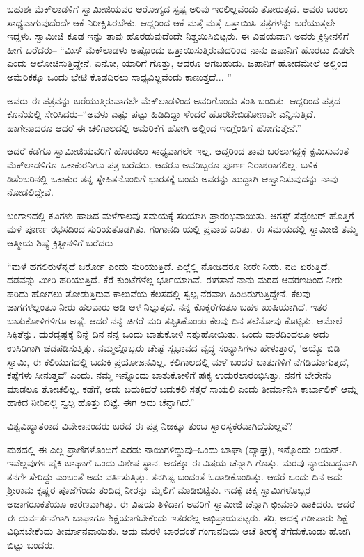 ಬಹುಶಃ ಮೆಕ್​ಲಾಡಳಿಗೆ ಸ್ವಾಮೀಜಿಯವರ ಆರೋಗ್ಯದ ಸ್ಪಷ್ಟ ಅರಿವು ಇರಲಿಲ್ಲವೆಂದು ತೋರುತ್ತದೆ. ಅವರು ಬರಲು ಸಾಧ್ಯವಾಗುವುದೆಂದೇ ಆಕೆ ನಿರೀಕ್ಷಿಸಿರಬೇಕು. ಆದ್ದರಿಂದ ಆಕೆ ಮತ್ತೆ ಮತ್ತೆ ಒತ್ತಾಯಿಸಿ ಪತ್ರಗಳನ್ನು ಬರೆಯುತ್ತಲೇ ಇದ್ದಳು. ಸ್ವಾಮೀಜಿ ಕೂಡ ಇನ್ನು ತಾವು ಹೊರಡುವುದೆಂದೇ ನಿಶ್ಚಯಿಸಿಬಿಟ್ಟರು. ಈ ವಿಷಯವಾಗಿ ಅವರು ಕ್ರಿಸ್ಟೀನಳಿಗೆ ಹೀಗೆ ಬರೆದರು– “ಮಿಸ್ ಮೆಕ್​ಲಾಡಳು ಅಷ್ಟೊಂದು ಒತ್ತಾಯಿಸುತ್ತಿರುವುದರಿಂದ ನಾನು ಜಪಾನಿಗೆ ಹೊರಟು ಬಿಡಲೇ ಎಂದು ಆಲೋಚಿಸುತ್ತಿದ್ದೇನೆ. ಏನೋ, ಯಾರಿಗೆ ಗೊತ್ತು, ಆದರೂ ಆಗಬಹುದು. ಜಪಾನಿಗೆ ಹೋದಮೇಲೆ ಅಲ್ಲಿಂದ ಅಮೆರಿಕಕ್ಕೂ ಒಂದು ಭೇಟಿ ಕೊಡದಿರಲು ಸಾಧ್ಯವಿಲ್ಲವೆಂದು ಕಾಣುತ್ತದೆ... ”

ಅವರು ಈ ಪತ್ರವನ್ನು ಬರೆಯುತ್ತಿರುವಾಗಲೇ ಮೆಕ್​ಲಾಡಳಿಂದ ಅವರಿಗೊಂದು ತಂತಿ ಬಂದಿತು. ಆದ್ದರಿಂದ ಪತ್ರದ ಕೊನೆಯಲ್ಲಿ ಸೇರಿಸಿದರು–“ಅವಳು ಎಷ್ಟು ಪಟ್ಟು ಹಿಡಿದಿದ್ದಾ ಳೆಂದರೆ ಹೊರಟೇಬಿಡೋಣವೇ ಎನ್ನಿಸುತ್ತಿದೆ. ಹಾಗೇನಾದರೂ ಆದರೆ ಈ ಚಳಿಗಾಲದಲ್ಲಿ ಅಮೆರಿಕೆಗೆ ಹೋಗಿ ಅಲ್ಲಿಂದ ಇಂಗ್ಲೆಂಡಿಗೆ ಹೋಗುತ್ತೇನೆ.”

ಆದರೆ ಕಡೆಗೂ ಸ್ವಾಮೀಜಿಯವರಿಗೆ ಹೊರಡಲು ಸಾಧ್ಯವಾಗಲೇ ಇಲ್ಲ. ಆದ್ದರಿಂದ ತಾವು ಬರಲಾಗದ್ದಕ್ಕೆ ಕ್ಷಮಿಸುವಂತೆ ಮೆಕ್​ಲಾಡಳಿಗೂ ಒಕಾಕುರನಿಗೂ ಪತ್ರ ಬರೆದರು. ಆದರೂ ಅವರಿಬ್ಬರೂ ಪೂರ್ಣ ನಿರಾಶರಾಗಲಿಲ್ಲ. ಬಳಿಕ ಡಿಸೆಂಬರಿನಲ್ಲಿ ಒಕಾಕುರ ತನ್ನ ಸ್ನೇಹಿತನೊಂದಿಗೆ ಭಾರತಕ್ಕೆ ಬಂದು ಅವರನ್ನು ಖುದ್ದಾಗಿ ಆಹ್ವಾನಿಸುವುದನ್ನು ನಾವು ನೋಡಲಿದ್ದೇವೆ.

ಬಂಗಾಳದಲ್ಲಿ ಕವಿಗಳು ಹಾಡಿದ ಮಳೆಗಾಲವು ಸಮಯಕ್ಕೆ ಸರಿಯಾಗಿ ಪ್ರಾರಂಭವಾಯಿತು. ಆಗಸ್ಟ್​-ಸೆಪ್ಟೆಂಬರ್ ಹೊತ್ತಿಗೆ ಮಳೆ ಪೂರ್ಣ ರಭಸದಿಂದ ಸುರಿಯತೊಡಗಿತು. ಗಂಗಾನದಿ ಯಲ್ಲಿ ಪ್ರವಾಹ ಏರಿತು. ಈ ಸಮಯದಲ್ಲಿ ಸ್ವಾಮೀಜಿ ತಮ್ಮ ಆತ್ಮೀಯ ಶಿಷ್ಯೆ ಕ್ರಿಸ್ಟೀನಳಿಗೆ ಬರೆದರು–

“ಮಳೆ ಹಗಲಿರುಳೆನ್ನದೆ ಜರ್ರೋ ಎಂದು ಸುರಿಯುತ್ತಿದೆ. ಎಲ್ಲೆಲ್ಲಿ ನೋಡಿದರೂ ನೀರೇ ನೀರು. ನದಿ ಏರುತ್ತಿದೆ. ದಡವನ್ನು ಮೀರಿ ಹರಿಯುತ್ತಿದೆ. ಕೆರೆ ಕುಂಟೆಗಳೆಲ್ಲ ಭರ್ತಿಯಾಗಿವೆ. ಈಗತಾನೆ ನಾನು ಮಠದ ಆವರಣದಿಂದ ನೀರು ಹರಿದು ಹೋಗಲು ತೋಡುತ್ತಿರುವ ಕಾಲುವೆಯ ಕೆಲಸದಲ್ಲಿ ಸ್ವಲ್ಪ ನೆರವಾಗಿ ಹಿಂದಿರುಗುತ್ತಿದ್ದೇನೆ. ಕೆಲವು ಜಾಗಗಳಲ್ಲಂತೂ ನೀರು ಹಲವಾರು ಅಡಿ ಆಳ ನಿಲ್ಲುತ್ತದೆ. ನನ್ನ ಕೊಕ್ಕರೆಗಂತೂ ಬಹಳ ಖುಷಿಯಾಗಿದೆ. ಇತರ ಬಾತುಕೋಳಿಗಳಿಗೂ ಅಷ್ಟೆ. ಆದರೆ ನನ್ನ ಚಿಗರೆ ಮರಿ ತಪ್ಪಿಸಿಕೊಂಡು ಕೆಲವು ದಿನ ತಲೆನೋವು ಕೊಟ್ಟಿತು. ಆಮೇಲೆ ಸಿಕ್ಕಿತೆನ್ನು. ದುರದೃಷ್ಟಕ್ಕೆ ನಿನ್ನೆ ದಿನ ನನ್ನ ಒಂದು ಬಾತುಕೋಳಿ ಸತ್ತುಹೋಯಿತು. ಒಂದು ವಾರದಿಂದಲೂ ಅದು ಉಸಿರಿಗಾಗಿ ಚಡಪಡಿಸುತ್ತಿತ್ತು. ನಮ್ಮಲ್ಲೊಬ್ಬರು ಚೇಷ್ಟೆ ಸ್ವಭಾವದ ವೃದ್ಧ ಸಂನ್ಯಾಸಿಗಳು ಹೇಳುತ್ತಾರೆ, ‘ಅಯ್ಯೊ ಬಿಡಿ ಸ್ವಾಮಿ, ಈ ಕಲಿಯುಗದಲ್ಲಿ ಬದುಕಿ ಪ್ರಯೋಜನವಿಲ್ಲ. ಕಲಿಗಾಲದಲ್ಲಿ ಮಳೆ ಬಂದರೆ ಬಾತುಗಳಿಗೆ ನೆಗಡಿಯಾಗುತ್ತದೆ, ಕಪ್ಪೆಗಳು ಸೀನುತ್ತವೆ’ ಎಂದು. ನಮ್ಮ ಇನ್ನೊಂದು ಬಾತುಕೋಳಿಗೆ ಪುಕ್ಕ ಉದುರಲಾರಂಭಿಸಿತ್ತು. ನನಗೆ ಬೇರೇನು ಮಾಡಲೂ ತೋಚಲಿಲ್ಲ. ಕಡೆಗೆ, ಅದು ಬದುಕಿದರೆ ಬದುಕಲಿ ಸತ್ತರೆ ಸಾಯಲಿ ಎಂದು ತೀರ್ಮಾನಿಸಿ ಕಾರ್ಬಾಲಿಕ್ ಆಮ್ಲ ಹಾಕಿದ ನೀರಿನಲ್ಲಿ ಸ್ವಲ್ಪ ಹೊತ್ತು ಬಿಟ್ಟೆ. ಈಗ ಅದು ಚೆನ್ನಾಗಿದೆ.”

ವಿಶ್ವವಿಖ್ಯಾತರಾದ ವಿವೇಕಾನಂದರು ಬರೆದ ಈ ಪತ್ರ ನಿಜಕ್ಕೂ ತುಂಬ ಸ್ವಾರಸ್ಯಕರವಾಗಿದೆಯಲ್ಲವೆ?

ಮಠದಲ್ಲಿ ಈ ಎಲ್ಲ ಪ್ರಾಣಿಗಳೊಂದಿಗೆ ಎರಡು ನಾಯಿಗಳಿದ್ದುವು–ಒಂದು ಬಾಘಾ (ವ್ಯಾಘ್ರ), ಇನ್ನೊಂದು ಲಯನ್. ಇವೆಲ್ಲವುಗಳ ಪೈಕಿ ಬಾಘಾಗೆ ಒಂದು ವಿಶೇಷ ಸ್ಥಾನ. ಅದಕ್ಕೂ ಈ ವಿಷಯ ಚೆನ್ನಾಗಿ ಗೊತ್ತು. ಮಠವು ನ್ಯಾಯಬದ್ಧವಾಗಿ ತನಗೇ ಸೇರಿದ್ದು ಎಂಬಂತೆ ಅದು ವರ್ತಿಸುತ್ತಿತ್ತು. ತನಗಿಷ್ಟ ಬಂದಂತೆ ಓಡಾಡಿಕೊಂಡಿತ್ತು. ಆದರೆ ಒಂದು ದಿನ ಅದು ಶ್ರೀರಾಮ ಕೃಷ್ಣರ ಪೂಜೆಗೆಂದು ತಂದಿದ್ದ ನೀರನ್ನು ಮೈಲಿಗೆ ಮಾಡಿಬಿಟ್ಟಿತು. ಇದಕ್ಕೆ ಚಿಕ್ಕ ಸ್ವಾಮಿಗಳೊಬ್ಬರ ಅಜಾಗರೂಕತೆಯೂ ಕಾರಣವಾಗಿತ್ತು. ಈ ವಿಷಯ ತಿಳಿದಾಗ ಅವರಿಗೆ ಸ್ವಾಮೀಜಿ ಚೆನ್ನಾಗಿ ಛೀಮಾರಿ ಹಾಕಿದರು. ಆದರೆ ಈ ದುರ್ವರ್ತನೆಗಾಗಿ ಬಾಘಾಗೂ ಶಿಕ್ಷೆಯಾಗಬೇಕೆಂದು ಇತರರೆಲ್ಲ ಅಭಿಪ್ರಾಯಪಟ್ಟರು. ಸರಿ, ಅದಕ್ಕೆ ಗಡೀಪಾರು ಶಿಕ್ಷೆ ವಿಧಿಸಬೇಕೆಂದು ತೀರ್ಮಾನವಾಯಿತು. ಅದು ಮರಳಿ ಬಾರದಂತೆ ಗಂಗಾನದಿಯ ಆಚೆ ತೀರಕ್ಕೆ ತೆಗೆದುಕೊಂಡು ಹೋಗಿ ಬಿಟ್ಟು ಬಂದರು.

